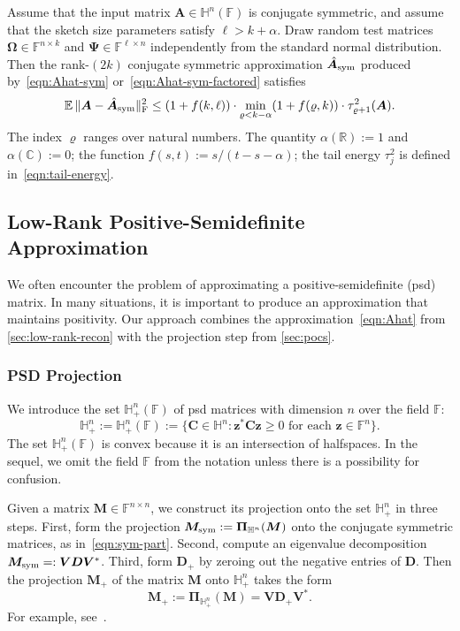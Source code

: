\documentclass[final]{siamart1116}
\numberwithin{equation}{section}
\numberwithin{theorem}{section}
\numberwithin{figure}{section}
\newcommand{\R}{\mathbb{R}}
\newcommand{\C}{\mathbb{C}}
\newcommand{\F}{\mathbb{F}}
\newcommand{\vct}[1]{\bm{#1}}
\newcommand{\mtx}[1]{\bm{#1}}
\newcommand{\norm}[1]{\Vert #1 \Vert}
\newcommand{\fnorm}[1]{\norm{#1}_{\mathrm{F}}}
\newcommand{\fnormsq}[1]{\fnorm{#1}^2}
\newcommand{\Expect}{\operatorname{\mathbb{E}}}
\begin{document}
\begin{corollary} \label{cor:symm-recon}
Assume that the input matrix $\mtx{A} \in \mathbb{H}^n(\F)$ is conjugate symmetric,
and assume that the sketch size parameters satisfy $\ell > k + \alpha$.
Draw random test matrices $\mtx{\Omega} \in \F^{n \times k}$ and $\mtx{\Psi} \in \F^{\ell \times n}$
independently from the standard normal distribution.
Then the rank-$(2k)$ conjugate symmetric approximation $\hat{\mtx{A}}_{\rm sym}$
produced by~\cref{eqn:Ahat-sym} or~\cref{eqn:Ahat-sym-factored} satisfies
$$
\Expect \fnormsq{ \mtx{A} - \hat{\mtx{A}}_{\rm sym} }
	\leq (1 + f(k,\ell)) \cdot \min_{\varrho < k - \alpha} (1 + f(\varrho,k)) \cdot \tau_{\varrho+1}^2(\mtx{A}).
$$
The index $\varrho$ ranges over natural numbers.
The quantity $\alpha(\R) := 1$ and $\alpha(\C) := 0$;
the function $f(s, t) := s/(t-s-\alpha)$;
the tail energy $\tau_j^2$ is defined in~\cref{eqn:tail-energy}.
\end{corollary}








\subsection{Low-Rank Positive-Semidefinite Approximation}

We often encounter the problem of approximating a positive-semidefinite (psd)
matrix.  In many situations, it is important to produce an approximation
that maintains positivity.  Our approach combines the
approximation~\cref{eqn:Ahat} from \cref{sec:low-rank-recon}
with the projection step from \cref{sec:pocs}.

\subsubsection{PSD Projection}

We introduce the set $\mathbb{H}_+^n(\F)$ of psd matrices with dimension $n$
over the field $\F$:
$$
\mathbb{H}_+^n := \mathbb{H}_+^n(\F)
:= \big\{ \mtx{C} \in \mathbb{H}^n : \vct{z}^* \mtx{C} \vct{z} \geq 0
\text{ for each $\vct{z} \in \F^n$} \big\}.
$$
The set $\mathbb{H}_+^n(\F)$ is convex because it is an intersection of halfspaces.
In the sequel, we omit the field $\F$ from the notation unless there is a possibility
for confusion.

Given a matrix $\mtx{M} \in \F^{n \times n}$, we construct its projection
onto the set $\mathbb{H}_+^n$ in three steps.
First, form the projection $\mtx{M}_{\rm sym} := \mtx{\Pi}_{\mathbb{H}^n}(\mtx{M})$
onto the conjugate symmetric matrices, as in~\cref{eqn:sym-part}.
Second, compute an eigenvalue decomposition $\mtx{M}_{\rm sym} =: \mtx{VDV}^*$.
Third, form $\mtx{D}_+$ by zeroing out the negative entries of $\mtx{D}$.
Then the projection $\mtx{M}_+$ of the matrix $\mtx{M}$ onto $\mathbb{H}^n_+$ takes the form
$$
\mtx{M}_+ := \mtx{\Pi}_{\mathbb{H}_+^n}(\mtx{M}) = \mtx{V} \mtx{D}_+ \mtx{V}^*.
$$
For example, see~\cite[Sec.~3]{Hig89:Matrix-Nearness}.
\end{document}
